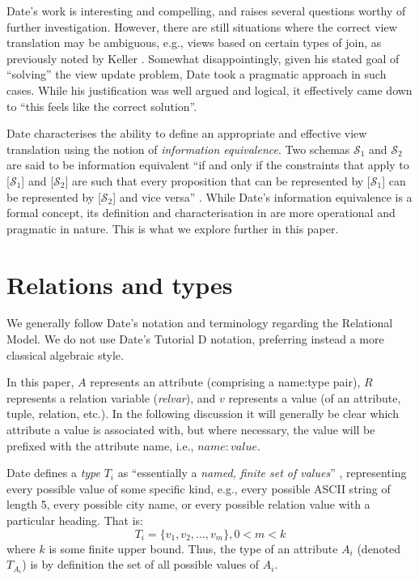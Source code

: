 \documentclass{sig-alternate-05-2015}
\newcounter{constraint}
\newcommand{\T}[1]{\ensuremath{T_{#1}}}
\newcommand{\SC}[1]{\ensuremath{\mathcal{S}_{#1}}}
\begin{document}
Date's work is interesting and compelling, and raises several questions worthy of further investigation. However, there are still situations where the correct view translation may be ambiguous, e.g., views based on certain types of join, as previously noted by Keller \cite{Keller.A-1985a-Algorithms}. Somewhat disappointingly, given his stated goal of ``solving'' the view update problem, Date took a pragmatic approach in such cases. While his justification was well argued and logical, it effectively came down to ``this feels like the correct solution''.

Date characterises the ability to define an appropriate and effective view translation using the notion of \emph{information equivalence}. Two schemas \(\SC{1}\) and \(\SC{2}\) are said to be information equivalent ``if and only if the constraints that apply to [\(\SC{1}\)] and [\(\SC{2}\)] are such that every proposition that can be represented by [\(\SC{1}\)] can be represented by [\(\SC{2}\)] and vice versa'' \cite{Date.C-2013a-View}. While Date's information equivalence is a formal concept, its definition and characterisation in \cite{Date.C-2013a-View} are more operational and pragmatic in nature. This is what we explore further in this paper.




\section{Relations and types}
\label{sec-relations-types}

\noindent We generally follow Date's \cite{Date.C-2012a-SQL-and-Relational} notation and terminology regarding the Relational Model. We do not use Date's Tutorial D notation, preferring instead a more classical algebraic style.

In this paper, \(A\) represents an attribute (comprising a name:type pair), \(R\) represents a relation variable (\emph{relvar}), and \(v\) represents a value (of an attribute, tuple, relation, etc.). In the following discussion it will generally be clear which attribute a value is associated with, but where necessary, the value will be prefixed with the attribute name, i.e., \(\mathit{name}\colon\mathit{value}\).

Date defines a \emph{type} \(\T{i}\) as ``essentially a \emph{named, finite set of values}'' \cite{Date.C-2012a-SQL-and-Relational}, representing every possible value of some specific kind, e.g., every possible ASCII string of length 5, every possible city name, or every possible relation value with a particular heading. That is:
\begin{equation}\label{eqn-type}
    \T{i} = \{v_{1}, v_{2}, \dotsc, v_{m}\}, 0 < m < k
\end{equation}
where \(k\) is some finite upper bound. Thus, the type of an attribute \(A_{i}\) (denoted \(\T{A_{i}}\)) is by definition the set of all possible values of \(A_{i}\).
\end{document}
